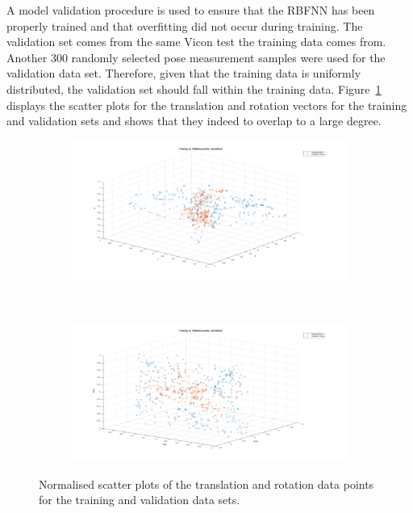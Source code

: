 A model validation procedure is used to ensure that the RBFNN has been properly trained and that overfitting did not occur during training. The validation set comes from the same Vicon test the training data comes from. Another 300 randomly selected  pose measurement samples were used for the validation data set. Therefore, given that the training data is uniformly distributed, the validation set should fall within the training data. Figure~\ref{fig:chap4-scatter-tr-v} displays the scatter plots for the translation and rotation vectors for the training and validation sets and shows that they indeed to overlap to a large degree. 

\begin{figure}
  \centering
  \begin{subfigure}{\textwidth}
    \includegraphics[clip, trim = 100 50 100 0, width=\textwidth]{figures/chapter4/3d_pose_tr_v}
    \caption{}
  \end{subfigure}
~
  \begin{subfigure}{\textwidth}
    \includegraphics[clip, trim = 100 50 100 0, width=\textwidth]{figures/chapter4/3d_rot_tr_v}
    \caption{}
  \end{subfigure}
  \caption[Scatter plots of the training and validation data. ]{Normalised scatter plots of the translation and rotation data points for the training and validation data sets. }
  \label{fig:chap4-scatter-tr-v}
\end{figure}

